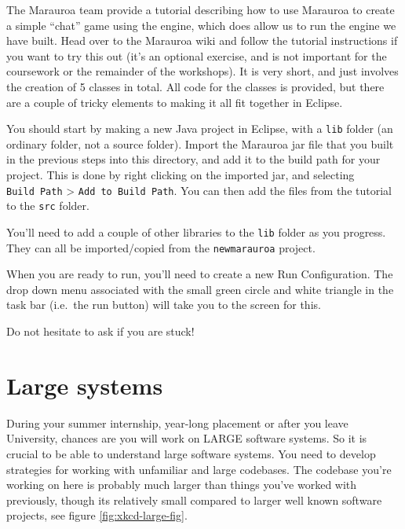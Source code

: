 \documentclass[
]{book}
\begin{document}
The Marauroa team provide a tutorial describing how to use Marauroa to create a simple ``chat'' game using the engine, which does allow us to run the engine we have built. Head over to the Marauroa wiki and follow the tutorial instructions if you want to try this out (it's an optional exercise, and is not important for the coursework or the remainder of the workshops). It is very short, and just involves the creation of 5 classes in total. All code for the classes is provided, but there are a couple of tricky elements to making it all fit together in Eclipse.

You should start by making a new Java project in Eclipse, with a \texttt{lib} folder (an ordinary folder, not a source folder). Import the Marauroa jar file that you built in the previous steps into this directory, and add it to the build path for your project. This is done by right clicking on the imported jar, and selecting \texttt{Build\ Path} \textgreater{} \texttt{Add\ to\ Build\ Path}. You can then add the files from the tutorial to the \texttt{src} folder.

You'll need to add a couple of other libraries to the \texttt{lib} folder as you progress. They can all be imported/copied from the \texttt{newmarauroa} project.

When you are ready to run, you'll need to create a new Run Configuration. The drop down menu associated with the small green circle and white triangle in the task bar (i.e.~the run button) will take you to the screen for this.

Do not hesitate to ask if you are stuck!

\hypertarget{understanding}{%
\chapter{Large systems}\label{understanding}}

During your summer internship, year-long placement or after you leave University, chances are you will work on LARGE software systems. So it is crucial to be able to understand large software systems. You need to develop strategies for working with unfamiliar and large codebases. The codebase you're working on here is probably much larger than things you've worked with previously, though its relatively small compared to larger well known software projects, see figure \ref{fig:xkcd-large-fig}.
\end{document}
